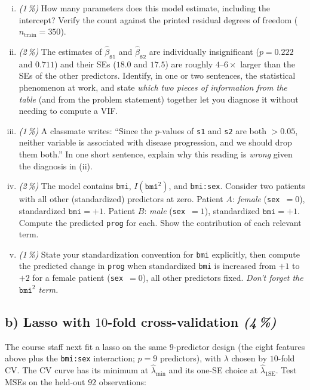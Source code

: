 \documentclass[11pt,a4paper]{article}
\newcommand{\subpoints}[1]{\textit{(#1\,\%)}}
\begin{document}
\begin{enumerate}[(i)]
  \item \subpoints{1} How many parameters does this model estimate, including the intercept? Verify the count against the printed residual degrees of freedom ($n_\text{train} = 350$).
  \item \subpoints{2} The estimates of $\hat\beta_{\texttt{s1}}$ and $\hat\beta_{\texttt{s2}}$ are individually insignificant ($p = 0.222$ and $0.711$) and their SEs ($18.0$ and $17.5$) are roughly $4$--$6\times$ larger than the SEs of the other predictors. Identify, in one or two sentences, the statistical phenomenon at work, and state \emph{which two pieces of information from the table} (and from the problem statement) together let you diagnose it without needing to compute a VIF.
  \item \subpoints{1} A classmate writes: ``Since the $p$-values of \texttt{s1} and \texttt{s2} are both $> 0.05$, neither variable is associated with disease progression, and we should drop them both.'' In one short sentence, explain why this reading is \emph{wrong} given the diagnosis in (ii).
  \item \subpoints{2} The model contains \texttt{bmi}, $I(\texttt{bmi}^2)$, and \texttt{bmi:sex}. Consider two patients with all other (standardized) predictors at zero. Patient $A$: \emph{female} (\texttt{sex}~$=0$), standardized $\texttt{bmi} = +1$. Patient $B$: \emph{male} (\texttt{sex}~$=1$), standardized $\texttt{bmi} = +1$. Compute the predicted \texttt{prog} for each. Show the contribution of each relevant term.
  \item \subpoints{1} State your standardization convention for \texttt{bmi} explicitly, then compute the predicted change in \texttt{prog} when standardized \texttt{bmi} is increased from $+1$ to $+2$ for a female patient (\texttt{sex}~$=0$), all other predictors fixed. \emph{Don't forget the $\texttt{bmi}^2$ term.}
\end{enumerate}

\subsection*{b) Lasso with $10$-fold cross-validation \subpoints{4}}

The course staff next fit a lasso on the same $9$-predictor design (the eight features above plus the \texttt{bmi:sex} interaction; $p = 9$ predictors), with $\lambda$ chosen by $10$-fold CV. The CV curve has its minimum at $\hat\lambda_{\min}$ and its one-SE choice at $\hat\lambda_{1\mathrm{SE}}$. Test MSEs on the held-out $92$ observations:
\end{document}
